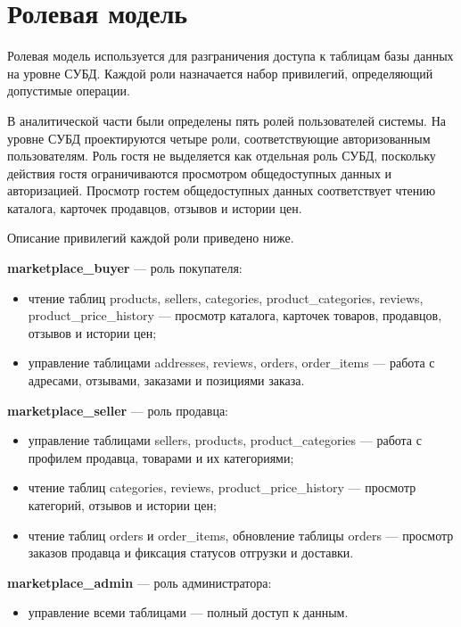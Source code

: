 
\section{Ролевая модель}

Ролевая модель используется для разграничения доступа к таблицам базы данных на уровне СУБД. Каждой роли назначается набор привилегий, определяющий допустимые операции.

В аналитической части были определены пять ролей пользователей системы. На уровне СУБД проектируются четыре роли, соответствующие авторизованным пользователям. Роль гостя не выделяется как отдельная роль СУБД, поскольку действия гостя ограничиваются просмотром общедоступных данных и авторизацией. Просмотр гостем общедоступных данных соответствует чтению каталога, карточек продавцов, отзывов и истории цен.

Описание привилегий каждой роли приведено ниже.

\textbf{marketplace\_buyer} --- роль покупателя:
\begin{itemize}
    \item чтение таблиц products, sellers, categories, product\_categories, reviews, product\_price\_history --- просмотр каталога, карточек товаров, продавцов, отзывов и истории цен;
    \item управление таблицами addresses, reviews, orders, order\_items --- работа с адресами, отзывами, заказами и позициями заказа.
\end{itemize}

\textbf{marketplace\_seller} --- роль продавца:
\begin{itemize}
    \item управление таблицами sellers, products, product\_categories --- работа с профилем продавца, товарами и их категориями;
    \item чтение таблиц categories, reviews, product\_price\_history --- просмотр категорий, отзывов и истории цен;
    \item чтение таблиц orders и order\_items, обновление таблицы orders --- просмотр заказов продавца и фиксация статусов отгрузки и доставки.
\end{itemize}

\textbf{marketplace\_admin} --- роль администратора:
\begin{itemize}
    \item управление всеми таблицами --- полный доступ к данным.
\end{itemize}

